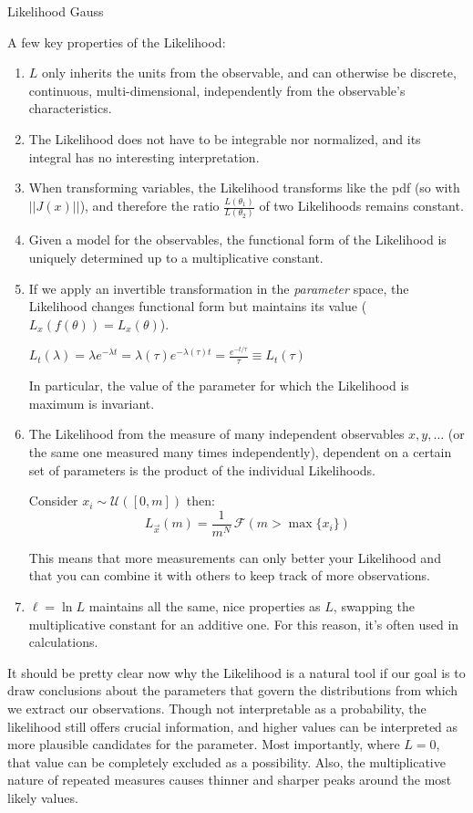 \begin{example}
Likelihood Gauss
\end{example}

A few key properties of the Likelihood:
\begin{enumerate}
	\item $L$ only inherits the units from the observable, and can otherwise be discrete, continuous, multi-dimensional, independently from the observable's characteristics.
	\item The Likelihood does not have to be integrable nor normalized, and its integral has no interesting interpretation.
	\item When transforming variables, the Likelihood transforms like the pdf (so with $||J(x)||$), and therefore the ratio $\frac{L\left(\theta_1\right)}{L\left(\theta_2\right)}$ of two Likelihoods remains constant.
	\item Given a model for the observables, the functional form of the Likelihood is uniquely determined up to a multiplicative constant.
	\item If we apply an invertible transformation in the 	\emph{parameter} space, the Likelihood changes functional form but maintains its value ($L_x(f(\theta)) = L_x(\theta)$). 
	\begin{example}
		$L_{t}(\lambda)=\lambda e^{-\lambda t}=\lambda(\tau) e^{-\lambda(\tau) t}=\frac{e^{-t/\tau}}{\tau}\equiv L_{t}(\tau)$
	\end{example}
	In particular, the value of the parameter for which the Likelihood is maximum is invariant. 
	\item The Likelihood from the measure of many independent observables $x,y,\dots$ (or the same one measured many times independently), dependent on a certain set of parameters is the product of the individual Likelihoods. 
	\begin{example}
		Consider $x_i \sim \mathcal{U}([0,m])$ then:
		\[
		L_{\vec{x}}(m)=\frac{1}{m^N}\,\mathscr{F}(m>\max\{x_i\})
		\]
	\end{example}
	This means that more measurements can only better your Likelihood and that you can combine it with others to keep track of more observations. 
	\item $\ell =\ln{L}$ maintains all the same, nice properties as $L$, swapping the multiplicative constant for an additive one. For this reason, it's often used in calculations.
\end{enumerate}

It should be pretty clear now why the Likelihood is a natural tool if our goal is to draw conclusions about the parameters that govern the distributions from which we extract our observations. Though not interpretable as a probability, the likelihood still offers crucial information, and higher values can be interpreted as more plausible candidates for the parameter. Most importantly, where $L=0$, that value can be completely excluded as a possibility. Also, the multiplicative nature of repeated measures causes thinner and sharper peaks around the most likely values.

